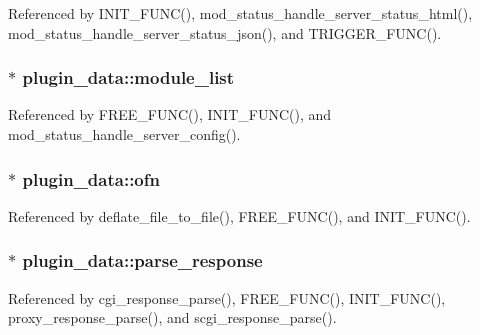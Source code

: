 Referenced by I\-N\-I\-T\-\_\-\-F\-U\-N\-C(), mod\-\_\-status\-\_\-handle\-\_\-server\-\_\-status\-\_\-html(), mod\-\_\-status\-\_\-handle\-\_\-server\-\_\-status\-\_\-json(), and T\-R\-I\-G\-G\-E\-R\-\_\-\-F\-U\-N\-C().

\hypertarget{structplugin__data_a6f474e783919fb262c67e8d523ba2ec1}{
\subsubsection[{module\-\_\-list}]{$\ast$ plugin\-\_\-data\-::module\-\_\-list}}\label{structplugin__data_a6f474e783919fb262c67e8d523ba2ec1}


Referenced by F\-R\-E\-E\-\_\-\-F\-U\-N\-C(), I\-N\-I\-T\-\_\-\-F\-U\-N\-C(), and mod\-\_\-status\-\_\-handle\-\_\-server\-\_\-config().

\hypertarget{structplugin__data_ad957c566c200b35d1f8d3d531afee55f}{
\subsubsection[{ofn}]{$\ast$ plugin\-\_\-data\-::ofn}}\label{structplugin__data_ad957c566c200b35d1f8d3d531afee55f}


Referenced by deflate\-\_\-file\-\_\-to\-\_\-file(), F\-R\-E\-E\-\_\-\-F\-U\-N\-C(), and I\-N\-I\-T\-\_\-\-F\-U\-N\-C().

\hypertarget{structplugin__data_aa8da61e6943d73483d763d33779fea0c}{
\subsubsection[{parse\-\_\-response}]{ $\ast$ plugin\-\_\-data\-::parse\-\_\-response}}\label{structplugin__data_aa8da61e6943d73483d763d33779fea0c}


Referenced by cgi\-\_\-response\-\_\-parse(), F\-R\-E\-E\-\_\-\-F\-U\-N\-C(), I\-N\-I\-T\-\_\-\-F\-U\-N\-C(), proxy\-\_\-response\-\_\-parse(), and scgi\-\_\-response\-\_\-parse().

